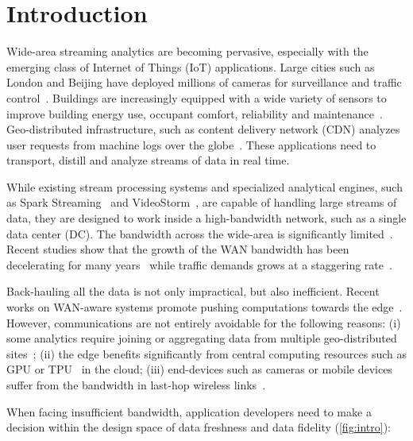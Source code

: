\section{Introduction}

Wide-area streaming analytics are becoming pervasive, especially with the
emerging class of Internet of Things (IoT) applications.  Large cities such as
London and Beijing have deployed millions of cameras for surveillance and
traffic control~\cite{london.surveillance, skynet}. Buildings are increasingly
equipped with a wide variety of sensors to improve building energy use, occupant
comfort, reliability and
maintenance~\cite{krioukov2012building}. Geo-distributed infrastructure, such as
content delivery network (CDN) analyzes user requests from machine logs over the
globe~\cite{mukerjee2015practical}. These applications need to transport,
distill and analyze streams of data in real time.

While existing stream processing systems and specialized analytical engines,
such as Spark Streaming~\cite{zaharia2013discretized} and
VideoStorm~\cite{zhang2017live}, are capable of handling large streams of data,
they are designed to work inside a high-bandwidth network, such as a single data
center (DC). The bandwidth across the wide-area is significantly
limited~\cite{hsieh17gaia, vulimiri2015global}. Recent studies show that the
growth of the WAN bandwidth has been decelerating for many
years~\cite{global2016telegeography} while traffic demands grows at a staggering
rate~\cite{index2013zettabyte}.

Back-hauling all the data is not only impractical, but also inefficient. Recent
works on WAN-aware systems promote pushing computations towards the
edge~\cite{satyanarayanan2009case, rabkin2014aggregation, pu2015low}. However,
communications are not entirely avoidable for the following reasons: (i) some
analytics require joining or aggregating data from multiple geo-distributed
sites~\cite{pu2015low, viswanathan2016clarinet}; (ii) the edge benefits
significantly from central computing resources such as GPU or
TPU~\cite{abadi2016tensorflow} in the cloud; (iii) end-devices such as cameras or
mobile devices suffer from the bandwidth in last-hop wireless
links~\cite{zhang2015design, abari2017enabling}.


When facing insufficient bandwidth, application developers need to make a
decision within the design space of data freshness and data fidelity
(\autoref{fig:intro}):

